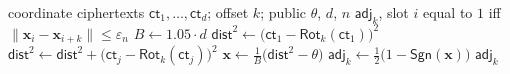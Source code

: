 \begin{algorithm}[t]
\caption{\textsf{Neighbor\_check}}
\label{alg:neighbor}
\begin{algorithmic}[1]
\Require coordinate ciphertexts $\mathsf{ct}_1, \dots, \mathsf{ct}_d$;
  offset $k$; public $\theta$, $d$, $n$
\Ensure $\mathsf{adj}_k$, slot $i$ equal to $1$ iff
  $\|\mathbf{x}_i - \mathbf{x}_{i+k}\| \le \varepsilon_n$
\State $B \gets 1.05 \cdot d$
\State $\mathsf{dist}^{2} \gets
  \bigl( \mathsf{ct}_1 - \mathsf{Rot}_k(\mathsf{ct}_1) \bigr)^{2}$
  \State $\mathsf{dist}^{2} \gets \mathsf{dist}^{2} +
    \bigl( \mathsf{ct}_j - \mathsf{Rot}_k(\mathsf{ct}_j) \bigr)^{2}$
\EndFor
\State $\mathbf{x} \gets \tfrac{1}{B}
  \bigl( \mathsf{dist}^{2} - \theta \bigr)$
\State $\mathsf{adj}_k \gets
  \tfrac{1}{2}\bigl( 1 - \mathsf{Sgn}(\mathbf{x}) \bigr)$
\State \Return $\mathsf{adj}_k$
\end{algorithmic}
\end{algorithm}
